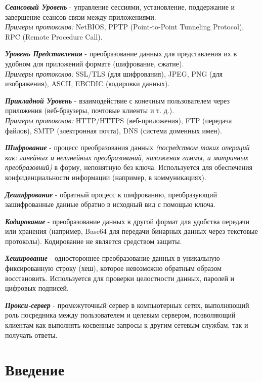\documentclass[utf8,14pt,a4paper,oneside,russian]{book}
\begin{document}
\textbf{\textit{Сеансовый Уровень}} - управление сессиями, установление, поддержание и завершение сеансов связи между приложениями.\\
\textit{Примеры протоколов:} NetBIOS, PPTP (Point-to-Point Tunneling Protocol), RPC (Remote Procedure Call).

\textbf{\textit{Уровень Представления}} - преобразование данных для представления их в удобном для приложений формате (шифрование, сжатие).\\
\textit{Примеры протоколов:} SSL/TLS (для шифрования), JPEG, PNG (для изображения), ASCII, EBCDIC (кодировки данных).

\textbf{\textit{Прикладной Уровень}} - взаимодействие с конечным пользователем через приложения (веб-браузеры, почтовые клиенты и т. д.).\\
\textit{Примеры протоколов:} HTTP/HTTPS (веб-приложения), FTP (передача файлов), SMTP (электронная почта), DNS (система доменных имен).

\textbf{\textit{Шифрование}} - процесс преобразования данных \textit{(посредством таких операций как: линейных и нелинейных преобразований,
    наложения гаммы, и матричных преобразовний)} в форму, непонятную без ключа. Используется для обеспечения конфиденциальности
информации (например, в коммуникациях).

\textbf{\textit{Дешифрование}} - обратный процесс к шифрованию, преобразующий зашифрованные данные обратно в исходный вид с помощью ключа.

\textbf{\textit{Кодирование}} - преобразование данных в другой формат для удобства передачи или хранения (например, Base64 для передачи
бинарных данных через текстовые протоколы). Кодирование не является средством защиты.

\textbf{\textit{Хеширование}} - одностороннее преобразование данных в уникальную фиксированную строку (хеш), которое невозможно обратным
образом восстановить. Используется для проверки целостности данных, паролей и цифровых подписей.

\textbf{\textit{Прокси-сервер}} - промежуточный сервер в компьютерных сетях, выполняющий роль посредника между пользователем и целевым сервером,
позволяющий клиентам как выполнять косвенные запросы к другим сетевым службам, так и получать ответы.

\newpage
\section{Введение}
\end{document}
